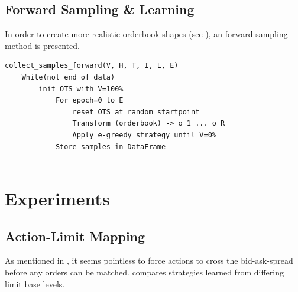 


\subsection{Forward Sampling \& Learning}
In order to create more realistic orderbook shapes (see ), an forward sampling method is presented.


\begin{lstlisting}[frame=single, breaklines=true, basicstyle=\scriptsize, caption=Forward sampling approach., label=lst:forward:pseudocode]
collect_samples_forward(V, H, T, I, L, E)
    While(not end of data)
        init OTS with V=100%
            For epoch=0 to E
                reset OTS at random startpoint
	            Transform (orderbook) -> o_1 ... o_R
	            Apply e-greedy strategy until V=0%
		    Store samples in DataFrame
		    
\end{lstlisting}




\section{Experiments}
\label{chap:experiments}
\subsection{Action-Limit Mapping}
\label{chap:exp:actionlimitmapping}
As mentioned in , it seems pointless to force actions to cross the bid-ask-spread before any orders can be matched.  compares strategies learned from differing limit base levels.

